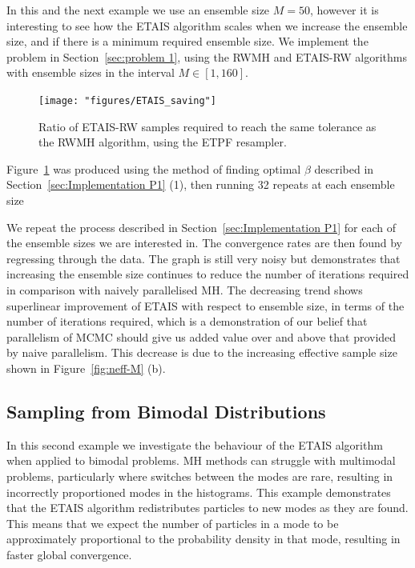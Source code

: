 \documentclass[final]{siamltex}
\begin{document}
In this and the next example we use an ensemble size $M=50$, however it is
interesting to see how the ETAIS algorithm scales when we increase the
ensemble size, and if there is a minimum required ensemble size. We
implement the problem in Section~\ref{sec:problem 1}, using
the RWMH and ETAIS-RW algorithms with ensemble sizes in the interval $M
\in [1, 160]$.

\begin{figure}[ht]
\begin{center}
\texttt{[image: "figures/ETAIS\_saving"]}
\caption{Ratio of ETAIS-RW samples required to reach the same tolerance
  as the RWMH algorithm, using the ETPF resampler.}
\label{fig:ETAIS_saving}
\end{center}
\end{figure}

Figure~\ref{fig:ETAIS_saving} was produced using the method of finding
optimal $\beta$ described in Section~\ref{sec:Implementation P1} (1),
then running 32 repeats at each ensemble size

We repeat the process described in Section~\ref{sec:Implementation P1}
for each of the ensemble sizes we are interested in. The convergence rates
are then found by regressing through the data. The graph is still very
noisy but demonstrates that increasing the ensemble size continues to
reduce the number of iterations required in comparison with naively
parallelised MH. The decreasing trend shows superlinear improvement of
ETAIS with respect to ensemble size, in terms of the number of
iterations required, which is a demonstration of our belief that
parallelism of MCMC should give us added value over and above that
provided by naive parallelism. This decrease is due to the increasing
effective sample size shown in Figure~\ref{fig:neff-M} (b).


\subsection{Sampling from Bimodal Distributions}
\label{sec:bimodal}

In this second example we investigate the behaviour of the ETAIS
algorithm when applied to bimodal problems. MH methods can struggle
with multimodal problems, particularly where switches between the
modes are rare, resulting in incorrectly proportioned modes in the
histograms. This example demonstrates that the ETAIS algorithm
redistributes particles to new modes as they are found. This means
that we expect the number of particles in a mode to be approximately
proportional to the probability density in that mode, resulting in
faster global convergence.
\end{document}
